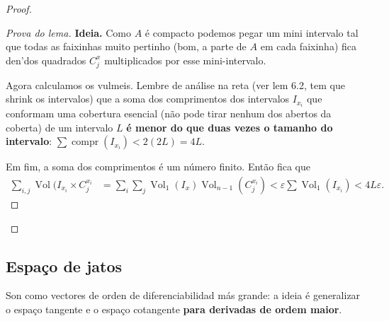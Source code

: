 \begin{proof}
\begin{enumerate}[label=\textbf{Passo \arabic*}]
\begin{proof}[Prova do lema]
	{\color{4}\bfseries Ideia.}\hspace{.5em} Como \(A\) é compacto podemos pegar um mini intervalo tal que todas as faixinhas muito pertinho (bom, a parte de \(A\) em cada faixinha) fica den'dos quadrados \(C^x_j\) multiplicados por esse mini-intervalo.

	Agora calculamos os vulmeis. Lembre de análise na reta (ver \cite{lee} lem 6.2, tem que shrink os intervalos) que a soma dos comprimentos dos intervalos \(I_{x_i}\) que conformam uma cobertura esencial (não pode tirar nenhum dos abertos da coberta) de um intervalo \(L\) \textbf{é menor do que duas vezes o tamanho do intervalo}:  \(\sum \operatorname{compr}(I_{x_i})< 2(2L)=4L\).

	Em fim, a soma dos comprimentos é um número finito. Então fica que
	\begin{align*}
	\sum_{i,j}\operatorname{Vol}(I_{x_i} \times C_j^{x_i}&= \sum_i \sum_j \operatorname{Vol}_1(I_x) \operatorname{Vol}_{n-1}(C_j^{x_i})<\varepsilon \sum \operatorname{Vol}_1(I_{x_i}) < 4L\varepsilon.
	\end{align*}
	\end{proof}
\end{enumerate}
\end{proof}

\subsection{Espaço de jatos}

Son como vectores de orden de diferenciabilidad más grande: a ideia é generalizar o espaço tangente e o espaço cotangente \textbf{para derivadas de ordem maior}.

